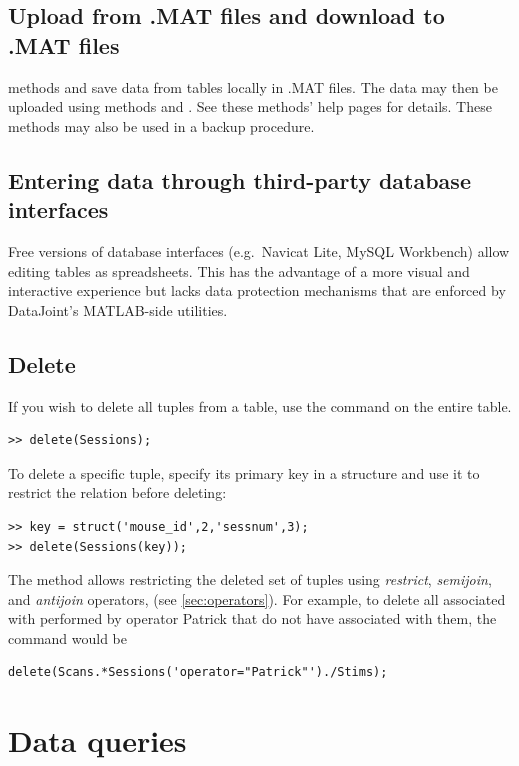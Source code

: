 \documentclass[10pt]{article}
\begin{document}
\subsection{Upload from  .MAT files and download to .MAT files}
 methods  and  save data from tables locally in .MAT files.  The data may then be uploaded using methods  and .  See these methods' help pages for details. These methods may also be used in a backup procedure.

\subsection{Entering data through third-party database interfaces}
Free versions of database interfaces (e.g.~Navicat Lite, MySQL Workbench) allow editing tables as spreadsheets.  This has the advantage of a more visual and interactive experience but lacks data protection mechanisms that are enforced by DataJoint's MATLAB-side utilities.

\subsection{Delete}
If you wish to delete all tuples from a table, use the  command on the entire table. 
\begin{lstlisting}
>> delete(Sessions);
\end{lstlisting}

To delete a specific tuple, specify its primary key in a structure and use it to restrict the relation before deleting:
\begin{lstlisting}
>> key = struct('mouse_id',2,'sessnum',3);
>> delete(Sessions(key));
\end{lstlisting}

The  method allows restricting the deleted set of tuples using {\em restrict}, {\em semijoin}, and {\em antijoin} operators, (see \autoref{sec:operators}). For example, to delete all  associated with  performed by operator Patrick that do not have  associated with them, the command would be
\begin{lstlisting}
delete(Scans.*Sessions('operator="Patrick"')./Stims);
\end{lstlisting}

\newpage\section{Data queries}
\end{document}
